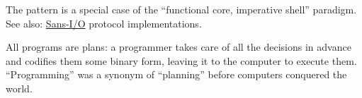 \documentclass{article}
\begin{document}
The pattern is a special case of the ``functional core, imperative shell'' paradigm.
See also: \href{https://sans-io.readthedocs.io/how-to-sans-io.html}{Sans-I/O} protocol implementations.

All programs are plans: a programmer takes care of all the decisions in advance and codifies them some binary form, leaving it to the computer to execute them.
``Programming'' was a synonym of ``planning'' before computers conquered the world.
\end{document}
